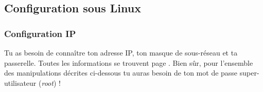 




\subsection{Configuration sous Linux}

\subsubsection{Configuration IP}
Tu as besoin de conna\^itre ton adresse IP, ton masque de sous-r\'eseau et ta  passerelle. Toutes les informations se trouvent page \pageref{calcul_ip}. Bien s\^ur, pour  l'ensemble des manipulations d\'ecrites ci-dessous tu auras besoin de ton  mot de passe super-utilisateur (\emph{root}) !

%
%


